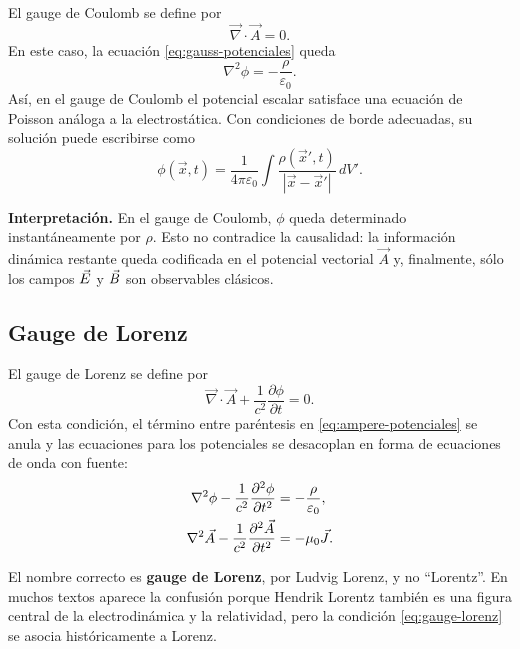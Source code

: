 \documentclass[../main.tex]{subfiles}
\begin{document}
El gauge de Coulomb se define por
\begin{equation}
    \boxed{\vec\nabla\cdot\vec A=0.}
    \label{eq:gauge-coulomb}
\end{equation}
En este caso, la ecuación \eqref{eq:gauss-potenciales} queda
\begin{equation}
    \boxed{\nabla^2\phi=-\frac{\rho}{\varepsilon_0}.}
    \label{eq:poisson-phi-coulomb}
\end{equation}
Así, en el gauge de Coulomb el potencial escalar satisface una ecuación de Poisson análoga a la electrostática. Con condiciones de borde adecuadas, su solución puede escribirse como
\begin{equation}
    \phi(\vec x,t)=\frac{1}{4\pi\varepsilon_0}
    \int \frac{\rho(\vec x',t)}{|\vec x-\vec x'|}\,dV'.
    \label{eq:phi-coulomb-integral}
\end{equation}

\begin{cajaidea}
\textbf{Interpretación.} En el gauge de Coulomb, $\phi$ queda determinado instantáneamente por $\rho$. Esto no contradice la causalidad: la información dinámica restante queda codificada en el potencial vectorial $\vec A$ y, finalmente, sólo los campos $\vec{E}$ y $\vec{B}$ son observables clásicos.
\end{cajaidea}

\subsection*{Gauge de Lorenz}

El gauge de Lorenz se define por
\begin{equation}
    \boxed{\vec\nabla\cdot\vec A+\frac{1}{c^2}\frac{\partial\phi}{\partial t}=0.}
    \label{eq:gauge-lorenz}
\end{equation}
Con esta condición, el término entre paréntesis en \eqref{eq:ampere-potenciales} se anula y las ecuaciones para los potenciales se desacoplan en forma de ecuaciones de onda con fuente:
\begin{align}
    \nabla^2\phi-\frac{1}{c^2}\frac{\partial^2\phi}{\partial t^2}
    &=-\frac{\rho}{\varepsilon_0},
    \label{eq:onda-phi-lorenz}\\
    \nabla^2\vec A-\frac{1}{c^2}\frac{\partial^2\vec A}{\partial t^2}
    &=-\mu_0\vec{J}.
    \label{eq:onda-A-lorenz}
\end{align}

\begin{cuidado}
El nombre correcto es \textbf{gauge de Lorenz}, por Ludvig Lorenz, y no ``Lorentz''. En muchos textos aparece la confusión porque Hendrik Lorentz también es una figura central de la electrodinámica y la relatividad, pero la condición \eqref{eq:gauge-lorenz} se asocia históricamente a Lorenz.
\end{cuidado}
\end{document}
